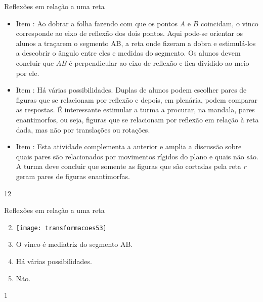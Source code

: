 \clearmargin
\begin{sugestions}{Reflexões em relação a uma reta}
{
\begin{itemize}[wide]
\item Item : Ao dobrar a folha fazendo com que os pontos $A$ e $B$ coincidam, o vinco corresponde ao eixo de reflexão dos dois pontos. Aqui pode-se orientar os alunos a traçarem o segmento AB, a reta onde fizeram a dobra e estimulá-los a descobrir o ângulo entre eles e medidas do segmento. Os alunos devem concluir que $AB$ é perpendicular ao eixo de reflexão e fica dividido ao meio por ele.  

\item Item : Há várias possibilidades. Duplas de alunos podem escolher pares de figuras que se relacionam por reflexão e depois, em plenária, podem comparar as respostas. É interessante estimular a turma a procurar, na mandala, pares enantimorfos, ou seja, figuras que se relacionam por reflexão em relação à reta dada, mas não por translações ou rotações.

\item Item : Esta atividade complementa a anterior e amplia a discussão sobre quais pares são relacionados por movimentos rígidos do plano e quais não são. A turma deve concluir que somente as figuras que são cortadas pela reta $r$ geram pares de figuras enantimorfas.  
\end{itemize}
}{1}{2}
\end{sugestions}
\begin{answer}{Reflexões em relação a uma reta}
{
\begin{enumerate}\setcounter{enumi}{1}
\item {}
{
\texttt{[image: transformacoes53]}
}

\item O vinco é mediatriz do segmento AB.
\item Há várias possibilidades. 
\item Não.

\end{enumerate}
}{1}
\end{answer}
\clearmargin
